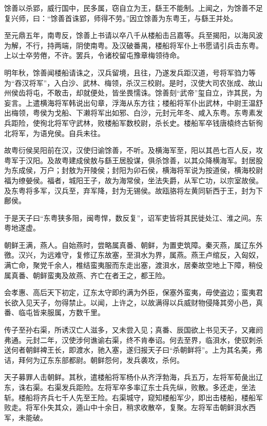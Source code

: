 \documentclass[]{article}
\begin{document}
馀善以杀郢，威行国中，民多属，窃自立为王，繇王不能制。上闻之，为馀善不足复兴师，曰：``馀善首诛郢，师得不劳。''因立馀善为东粤王，与繇王并处。

至元鼎五年，南粤反，馀善上书请以卒八千从楼船击吕嘉等。兵至揭阳，以海风波为解，不行，持两端，阴使南粤。及汉破番禺，楼船将军仆上书愿请引兵击东粤。上以士卒劳倦，不许。罢兵，令诸校留屯豫章梅领待命。

明年秋，馀善闻楼船请诛之，汉兵留境，且往，乃遂发兵距汉道，号将军驺力等为``吞汉将军''，入白沙、武林、梅领，杀汉三校尉。是时，汉使大司农张成、故山州侯齿将屯，不敢击，却就便处，皆坐畏懦诛。馀善刻``武帝''玺自立，诈其民，为妄言。上遣横海将军韩说出句章，浮海从东方往；楼船将军仆出武林，中尉王温舒出梅领，粤侯为戈船、下濑将军出如邪、白沙，元封元年冬、咸入东粤。东粤素发兵距险，使徇北将军守武林，败楼船军数校尉，杀长史。楼船军卒钱唐榬终古斩徇北将军，为语皃侯。自兵未往。

故粤衍侯吴阳前在汉，汉使归谕馀善，不听。及横海军至，阳以其邑七百人反，攻粤军于汉阳。及故粤建成侯敖与繇王居股谋，俱杀馀善，以其众降横海军。封居股为东成侯，万户；封敖为开陵侯；封阳为卯石侯，横海将军说为按道侯，横海校尉福为缭嫈侯。福者，城阳王子，故为海常侯，坐法失爵，从军亡功，以宗室故侯。及东粤将多军，汉兵至，弃军降，封为无锡侯。故瓯骆将左黄同斩西于王，封为下鄜侯。

于是天子曰``东粤狭多阻，闽粤悍，数反复''，诏军吏皆将其民徙处江、淮之间。东粤地遂虚。

朝鲜王满，燕人。自始燕时，尝略属真番、朝鲜，为置吏筑障。秦灭燕，属辽东外徼。汉兴，为远难守，复修辽东故塞，至浿水为界，属燕。燕王卢绾反，入匈奴，满亡命，聚党千余人，椎结蛮夷服而东走出塞，渡浿水，居秦故空地上下障，稍伇属真番、朝鲜蛮夷及故燕、齐亡在者王之，都王险。

会孝惠、高后天下初定，辽东太守即约满为外臣，保塞外蛮夷，毋使盗边；蛮夷君长欲入见天子，勿得禁止。以闻，上许之，以故满得以兵威财物侵降其旁小邑，真番、临屯皆来服属，方数千里。

传子至孙右渠，所诱汉亡人滋多，又未尝入见；真番、辰国欲上书见天子，又雍阏弗通。元封二年，汉使涉何谯谕右渠，终不肯奉诏。何去至界，临浿水，使驭刺杀送何者朝鲜裨王长，即渡水，驰入塞，遂归报天子曰``杀朝鲜将''。上为其名美，弗诘，拜何为辽东东部都尉。朝鲜怨何，发兵袭攻，杀何。

天子募罪人击朝鲜。其秋，遣楼船将军杨仆从齐浮勃海，兵五万，左将军荀彘出辽东，诛右渠。右渠发兵距险。左将军卒多率辽东士兵先纵，败散。多还走，坐法斩。楼船将齐兵七千人先至王险。右渠城守，窥知楼船军少，即出击楼船，楼船军败走。将军仆失其众，遁山中十余日，稍求收散卒，复聚。左将军击朝鲜浿水西军，未能破。
\end{document}
